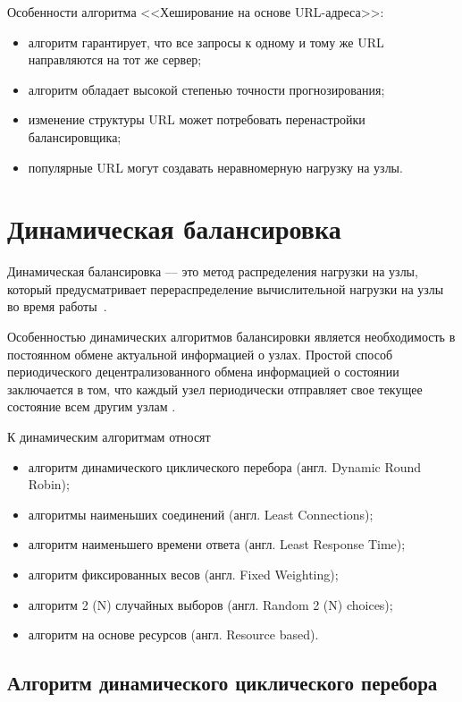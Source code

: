 Особенности алгоритма <<Хеширование на основе URL-адреса>>:
\begin{itemize}
	\item алгоритм гарантирует, что все запросы к одному и тому же URL направляются на тот же сервер;
	\item алгоритм обладает высокой степенью точности прогнозирования;
	\item изменение структуры URL может потребовать перенастройки балансировщика;
	\item популярные URL могут создавать неравномерную нагрузку на узлы.
\end{itemize}

\section{Динамическая балансировка}

Динамическая балансировка --- это метод распределения нагрузки на узлы, который предусматривает перераспределение вычислительной нагрузки на узлы во время работы~\cite{intuit}.
 

Особенностью динамических алгоритмов балансировки является необходимость в постоянном обмене актуальной информацией о узлах.
Простой способ периодического децентрализованного обмена информацией о состоянии заключается в том, что каждый узел периодически отправляет свое текущее состояние всем другим узлам \cite{drr}.

К динамическим алгоритмам относят~\cite{drr, dll_warsh, mainsource}
\begin{itemize}
	\item алгоритм динамического циклического перебора (англ. Dynamic Round Robin);
	\item алгоритмы наименьших соединений (англ. Least Connections);
	\item алгоритм наименьшего времени ответа (англ. Least Response Time);
    \item алгоритм фиксированных весов (англ. Fixed Weighting);
	\item алгоритм 2 (N) случайных выборов (англ. Random 2 (N) choices);
	\item алгоритм на основе ресурсов (англ. Resource based).
\end{itemize}


\subsection{Алгоритм динамического циклического перебора}

